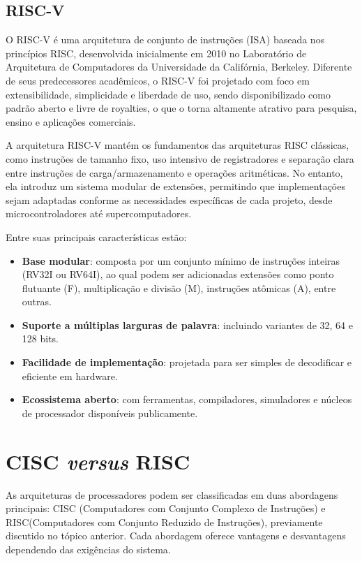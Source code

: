 \documentclass[
	12pt,				%
	openright,			%
	oneside,			%
	a4paper,			%
	english,			%
	french,				%
	spanish,			%
	brazil,				%
	]{abntex2}
\begin{document}
\subsection{RISC-V}

O RISC-V é uma arquitetura de conjunto de instruções (ISA) baseada nos princípios RISC, desenvolvida inicialmente em 2010 no Laboratório de Arquitetura de Computadores da Universidade da Califórnia, Berkeley. Diferente de seus predecessores acadêmicos, o RISC-V foi projetado com foco em extensibilidade, simplicidade e liberdade de uso, sendo disponibilizado como padrão aberto e livre de royalties, o que o torna altamente atrativo para pesquisa, ensino e aplicações comerciais.\cite[p.1]{patterson_risc-v_2016}

A arquitetura RISC-V mantém os fundamentos das arquiteturas RISC clássicas, como instruções de tamanho fixo, uso intensivo de registradores e separação clara entre instruções de carga/armazenamento e operações aritméticas. No entanto, ela introduz um sistema modular de extensões, permitindo que implementações sejam adaptadas conforme as necessidades específicas de cada projeto, desde microcontroladores até supercomputadores.\cite{risc-v_risc-v_2024}

Entre suas principais características estão:
\begin{itemize}
    \item \textbf{Base modular}: composta por um conjunto mínimo de instruções inteiras (RV32I ou RV64I), ao qual podem ser adicionadas extensões como ponto flutuante (F), multiplicação e divisão (M), instruções atômicas (A), entre outras.
    \item \textbf{Suporte a múltiplas larguras de palavra}: incluindo variantes de 32, 64 e 128 bits.
    \item \textbf{Facilidade de implementação}: projetada para ser simples de decodificar e eficiente em hardware.
    \item \textbf{Ecossistema aberto}: com ferramentas, compiladores, simuladores e núcleos de processador disponíveis publicamente.
\end{itemize}

\section{CISC \textit{versus} RISC}
As arquiteturas de processadores podem ser classificadas em duas abordagens principais: CISC (Computadores com Conjunto Complexo de Instruções) e RISC(Computadores com Conjunto Reduzido de Instruções)\cite[p.19]{catsoulis_designing_2002}, previamente discutido no tópico anterior. Cada abordagem oferece vantagens e desvantagens dependendo das exigências do sistema.
\end{document}
